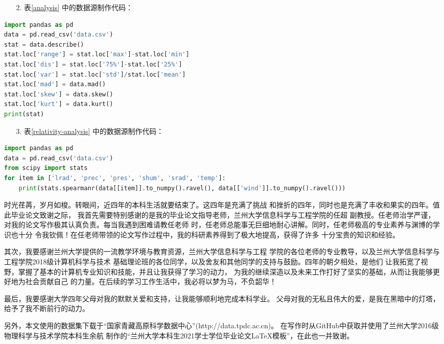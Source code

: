 \documentclass[AutoFakeBold]{LZUThesis}
\begin{document}
\begin{itemize}
\item[2. ] 表\ref{analysis} 中的数据源制作代码：
\end{itemize}

\begin{lstlisting}[language = python]
import pandas as pd
data = pd.read_csv('data.csv')
stat = data.describe()
stat.loc['range'] = stat.loc['max']-stat.loc['min']
stat.loc['dis'] = stat.loc['75%']-stat.loc['25%']
stat.loc['var'] = stat.loc['std']/stat.loc['mean']
stat.loc['mad'] = data.mad()
stat.loc['skew'] = data.skew()
stat.loc['kurt'] = data.kurt()
print(stat)
\end{lstlisting}

\begin{itemize}
\item[3. ] 表\ref{relativity-analysis} 中的数据源制作代码：
\end{itemize}

\begin{lstlisting}[language = python]
import pandas as pd
data = pd.read_csv('data.csv')
from scipy import stats
for item in ['lrad', 'prec', 'pres', 'shum', 'srad', 'temp']:
    print(stats.spearmanr(data[[item]].to_numpy().ravel(), data[['wind']].to_numpy().ravel()))
\end{lstlisting}
\Thanks

时光荏苒，岁月如梭。转眼间，近四年的本科生活就要结束了。这四年是充满了挑战
和挫折的四年，同时也是充满了丰收和果实的四年。值此毕业论文致谢之际，
我首先需要特别感谢的是我的毕业论文指导老师，兰州大学信息科学与工程学院的任超
副教授。任老师治学严谨，对我的论文写作极其认真负责。每当我遇到困难请教任老师
时，任老师总能事无巨细地耐心讲解。同时，任老师极高的专业素养与渊博的学识也十分
令我钦佩！在任老师带领的论文写作过程中，我的科研素养得到了极大地提高，获得了许多
十分宝贵的知识和经验。

其次，我要感谢兰州大学提供的一流教学环境与教育资源，兰州大学信息科学与工程
学院的各位老师的专业教导，以及兰州大学信息科学与工程学院2018级计算机科学与技术
基础理论班的各位同学，以及舍友和其他同学的支持与鼓励。四年的朝夕相处，是他们
让我拓宽了视野，掌握了基本的计算机专业知识和技能，并且让我获得了学习的动力，
为我的继续深造以及未来工作打好了坚实的基础，从而让我能够更好地为社会贡献自己
的力量。在后续的学习工作生活中，我必将以梦为马，不负韶华！

最后，我要感谢大学四年父母对我的默默关爱和支持，让我能够顺利地完成本科学业。
父母对我的无私且伟大的爱，是我在黑暗中的灯塔，给予了我不断前行的动力。

另外，本文使用的数据集下载于“国家青藏高原科学数据中心”(http://data.tpdc.ac.cn)。
在写作时从GitHub中获取并使用了兰州大学2016级物理科学与技术学院本科生余航
制作的“兰州大学本科生2021学士学位毕业论文LaTeX模板”，在此也一并致谢。
\end{document}
